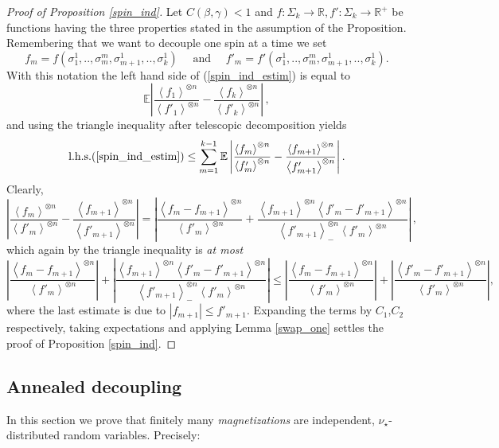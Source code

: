 \documentclass[a4paper,12pt,oneside,reqno]{amsart}
\numberwithin{equation}{section}
\begin{document}
\begin{proof}[Proof of Proposition \ref{spin_ind}]
Let $C({\beta},\gamma)<1$ and $f:\Sigma_k\rightarrow {\mathbb{R}},f':\Sigma_k\rightarrow {\mathbb{R}}^+$ be functions having the three properties stated in the assumption of the Proposition. Remembering that we want to decouple one spin at a time we set 
$$f_m= f\left(\sigma_{1}^1,..,\sigma_{m}^m,\sigma_{m+1}^1,..,\sigma_{k}^1 \right) \quad \text{ and } \quad f'_m = f'\left(\sigma_{1}^1,..,\sigma_{m}^m,\sigma_{m+1}^1,..,\sigma_{k}^1 \right).$$ 
With this notation the left hand side of (\ref{spin_ind_estim}) is equal to  
\[
{{\mathbb{E}}} \left| \frac{\left< f_1\right>^{\otimes n}}{\left< f'_1\right>^{\otimes n}}-\frac{\left< f_k\right>^{\otimes n}}{\left< f'_k\right>^{\otimes n}}\right|\,,
\]
and using the triangle inequality after telescopic decomposition yields 
\[
\mbox{l.h.s.} (\ref{spin_ind_estim}) \leq \sum\limits_{m=1}^{k-1} {{\mathbb{E}}}\left| \frac{\left<f_m\right>^{\otimes n}}{\left<f'_m\right>^{\otimes n}}-\frac{\left<f_{m+1}\right>^{\otimes n}}{\left<f'_{m+1}\right>^{\otimes n}} \right|.
\]
Clearly, 
\[
\left|\frac{\left<f_m\right>^{\otimes n}}{\left<f'_m\right>^{\otimes n}}-\frac{\left<f_{m+1}\right>^{\otimes n}}{\left<f'_{m+1}\right>^{\otimes n}}\right| = \left|\frac{\left<f_m-f_{m+1}\right>^{\otimes n}}{\left<f'_m\right>^{\otimes n}}+\frac{\left<f_{m+1}\right>^{\otimes n}\left<f'_{m}-f'_{m+1}\right>^{\otimes n}}{\left<f'_{m+1}\right>_{-}^{\otimes n}\left<f'_{m}\right>^{\otimes n}}\right| \,,
\]
which again by the triangle inequality is {\it at most}
\[
\left|\frac{\left<f_m-f_{m+1}\right>^{\otimes n}}{\left<f'_m\right>^{\otimes n}}\right|+\left|\frac{\left<f_{m+1}\right>^{\otimes n}\left<f'_{m}-f'_{m+1}\right>^{\otimes n}}{\left<f'_{m+1}\right>_{-}^{\otimes n}\left<f'_{m}\right>^{\otimes n}}\right|\leq \left|\frac{\left<f_m-f_{m+1}\right>^{\otimes n}}{\left<f'_m\right>^{\otimes n}}\right|+\left|\frac{\left<f'_{m}-f'_{m+1}\right>^{\otimes n}}{\left<f'_{m}\right>^{\otimes n}}\right|,
\]
where the last estimate is due to $\left|f_{m+1}\right|\leq f'_{m+1}$. Expanding the terms by $C_1$,$C_2$ respectively, taking expectations and applying Lemma \ref{swap_one} settles the proof of Proposition \ref{spin_ind}.
\end{proof}

\subsection{Annealed decoupling}\label{proof_mag_ind}
In this section we prove that finitely many {\it magnetizations} are independent, $\nu_\star$-distributed random variables. Precisely: 
\end{document}
